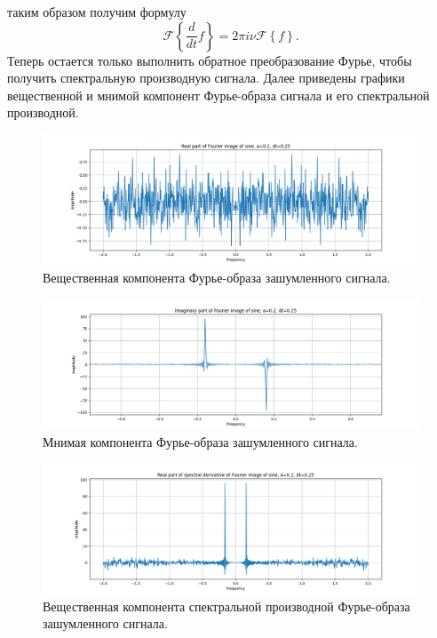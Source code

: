 \documentclass[a4paper, 12pt]{article}
\begin{document}
    таким образом получим формулу $$\mathcal{F}\left\{\frac{d}{dt}f\right\}=2\pi i \nu \mathcal{F}\left\{f\right\}.$$ Теперь остается только выполнить обратное преобразование Фурье, чтобы получить
    спектральную производную сигнала. Далее приведены графики вещественной и мнимой компонент Фурье-образа сигнала и его спектральной производной.
    \begin{figure}[H]
        \centering
        \includegraphics[scale=0.4]{1_re_fimg_sine.png}
        \captionsetup{skip=0pt}
        \caption{Вещественная компонента Фурье-образа зашумленного сигнала.}
        \label{fig:1refis}
    \end{figure}
    \begin{figure}[H]
        \centering
        \includegraphics[scale=0.4]{1_im_fimg_sine.png}
        \captionsetup{skip=0pt}
        \caption{Мнимая компонента Фурье-образа зашумленного сигнала.}
        \label{fig:1imfis}
    \end{figure}
    \begin{figure}[H]
        \centering
        \includegraphics[scale=0.4]{1_re_spd_fimg_sine.png}
        \captionsetup{skip=0pt}
        \caption{Вещественная компонента спектральной производной Фурье-образа зашумленного сигнала.}
        \label{fig:1respdf}
    \end{figure}
\end{document}

